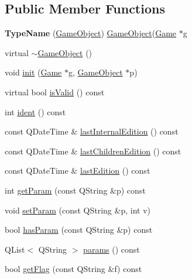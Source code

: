 \subsection*{\-Public \-Member \-Functions}
\begin{DoxyCompactItemize}
\item 
\hypertarget{class_game_object_a2d1b763875224ef2a6977aa086ae0613}{{\bfseries \-Type\-Name} (\hyperlink{class_game_object}{\-Game\-Object}) \hyperlink{class_game_object}{\-Game\-Object}(\hyperlink{class_game}{\-Game} $\ast$g}\label{class_game_object_a2d1b763875224ef2a6977aa086ae0613}

\item 
virtual \hyperlink{class_game_object_ab82dfdb656f9051c0587e6593b2dda97}{$\sim$\-Game\-Object} ()
\item 
void \hyperlink{class_game_object_a97be7b59b2e76e7d60de2146b894eed9}{init} (\hyperlink{class_game}{\-Game} $\ast$g, \hyperlink{class_game_object}{\-Game\-Object} $\ast$p)
\item 
virtual bool \hyperlink{class_game_object_a88676a10f8e905747f1d64c2da490524}{is\-Valid} () const 
\item 
int \hyperlink{class_game_object_a4d84063c56c17bfdee8844eb3fa3445a}{ident} () const 
\item 
const \-Q\-Date\-Time \& \hyperlink{class_game_object_a0c4cc65819b30ec36a1c20a1c24997fe}{last\-Internal\-Edition} () const 
\item 
const \-Q\-Date\-Time \& \hyperlink{class_game_object_acc65ad08191fcaf558bd1840a45d23cf}{last\-Children\-Edition} () const 
\item 
const \-Q\-Date\-Time \& \hyperlink{class_game_object_a73b351287147712a937e87028bf8c876}{last\-Edition} () const 
\item 
int \hyperlink{class_game_object_a27de46b2b9b439755b1e57df51c35caf}{get\-Param} (const \-Q\-String \&p) const 
\item 
void \hyperlink{class_game_object_a28b8af7f399f1348a4f3130dd21173a1}{set\-Param} (const \-Q\-String \&p, int v)
\item 
bool \hyperlink{class_game_object_aa48c29e1ac9e9289f4647f8e263b9fae}{has\-Param} (const \-Q\-String \&p) const 
\item 
\-Q\-List$<$ \-Q\-String $>$ \hyperlink{class_game_object_a3e851f9aceb9e868a73dd58fe8e3719f}{params} () const 
\item 
bool \hyperlink{class_game_object_a30bc22a11619930d442bc16f0c938339}{get\-Flag} (const \-Q\-String \&f) const 
\item 

\end{DoxyCompactItemize}

